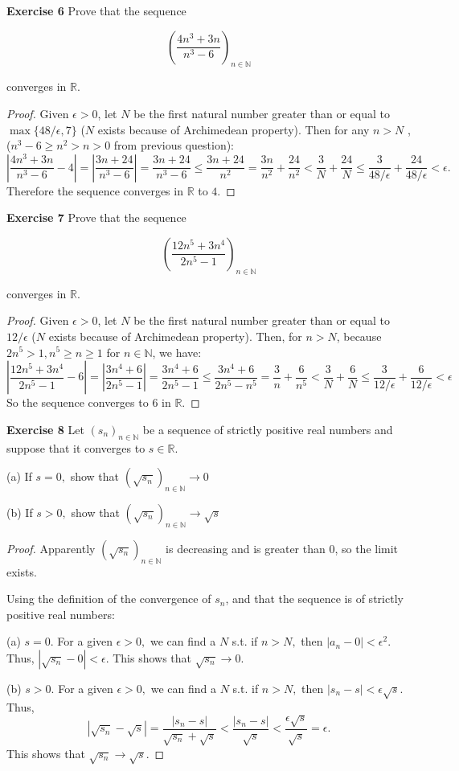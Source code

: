 \documentclass[12pt]{article}
\newcommand{\bbN}{\mathbb{N}}
\newcommand{\bbR}{\mathbb{R}}
\theoremstyle{definition}
\numberwithin{equation}{subsection}
\begin{document}
\textbf{Exercise 6} Prove  that the sequence

$$
\left(\frac{4 n^{3}+3 n}{n^{3}-6}\right)_{n \in \mathbb{N}}
$$

converges in $\bbR$.
\begin{proof}
    Given $\epsilon > 0$, let $N$ be the first natural number greater than or equal to $ \max\{48/\epsilon, 7\}$ ($N$ exists because of Archimedean property). Then for any $n > N$ , ($n^3-6\geq n^2 > n > 0 $ from previous question):
    $$
    \left|\frac{4 n^{3}+3 n}{n^{3}-6}-4\right| = \left|\frac{3 n +  24}{n^{3}-6}\right| = \frac{3 n +  24}{n^{3}-6} \leq \frac{3 n +  24}{n^2} = \frac{3 n }{n^2} +\frac{24}{n^2} < \frac{3}{N} + \frac{24}{N} \leq \frac{3}{48/\epsilon} + \frac{24}{48/\epsilon} < \epsilon. 
    $$
    Therefore the sequence converges in $\bbR$ to $4$. 
\end{proof}



\textbf{Exercise 7} Prove that the sequence

$$
\left(\frac{12 n^{5}+3 n^{4}}{2 n^{5}-1}\right)_{n \in \mathbb{N}}
$$

converges in $\bbR$.
\begin{proof}
    Given $\epsilon > 0$, let $N$ be the first natural number greater than or equal to $ 12/\epsilon$ ($N$ exists because of Archimedean property). Then, for $n > N$, because $2n^5>1, n^5 \geq n \geq 1$ for $n \in \bbN$, we have:
    $$
    \left|\frac{12n^5+3n^4}{2n^5-1}-6\right| = \left|\frac{3n^4+6}{2n^5-1}\right| = \frac{3n^4+6}{2n^5-1} \leq \frac{3n^4+6}{2n^5-n^5} = \frac{3}{n} + \frac{6}{n^5} < \frac{3}{N} + \frac{6}{N} \leq \frac{3}{12/\epsilon} + \frac{6}{12/\epsilon} < \epsilon
    $$
    So the sequence converges to $6$ in $\bbR$. 
\end{proof}

\textbf{Exercise 8} Let $\left(s_{n}\right)_{n \in \mathbb{N}}$ be a sequence of strictly positive real numbers and
suppose that it converges to $s \in \mathbb{R}$.

(a) If $s=0,$ show that $(\sqrt{s_{n}})_{n \in \mathbb{N}} \rightarrow 0$


(b) If $s>0,$ show that $(\sqrt{s_{n}})_{n \in \mathbb{N}} \rightarrow \sqrt{s}$
\begin{proof}
    Apparently $(\sqrt{s_{n}})_{n \in \mathbb{N}}$ is decreasing and is greater than 0, so the limit exists. 

Using the definition of the convergence of $s_n$, and that the sequence is of strictly positive real numbers:

(a) $s=0 .$ For a given $\epsilon>0,$ we can find a $N$ s.t. if $n>N,$ then $\left|a_{n}-0\right|<\epsilon^{2} .$ Thus, $|\sqrt{s_{n}}-0|<\epsilon .$ This shows that $\sqrt{s_{n}} \rightarrow 0$.


(b) $s>0 .$ For a given $\epsilon>0,$ we can find a $N$ s.t. if $n>N,$ then $\left|s_{n}-s\right|<\epsilon \sqrt{s} .$ Thus,
$$|\sqrt{s_{n}}-\sqrt{s}|=\frac{\left|s_{n}-s\right|}{\sqrt{s_{n}}+\sqrt{s}}<\frac{\left|s_{n}-s\right|}{\sqrt{s}}<\frac{\epsilon \sqrt{s}}{\sqrt{s}}=\epsilon .$$
This shows that $\sqrt{s_{n}} \rightarrow \sqrt{s}$.

\end{proof}
\end{document}
